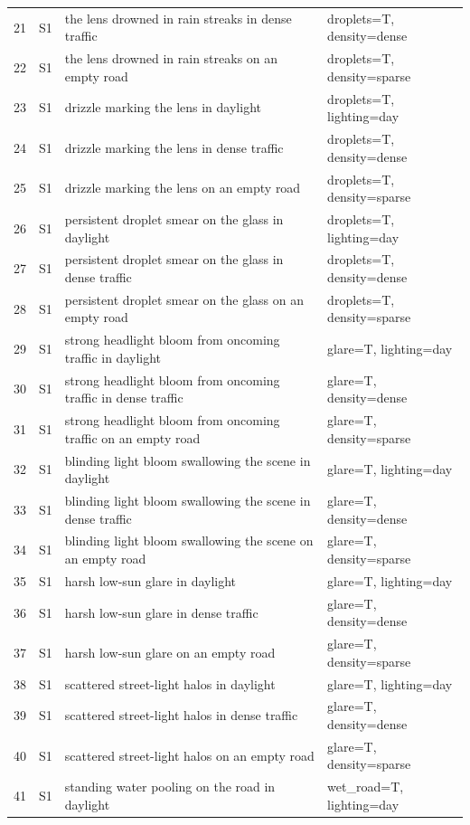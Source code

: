 \begin{longtable}{r l p{8.6cm} p{5.6cm}}
21 & S1 & the lens drowned in rain streaks in dense traffic & droplets=T, density=dense\\
22 & S1 & the lens drowned in rain streaks on an empty road & droplets=T, density=sparse\\
23 & S1 & drizzle marking the lens in daylight & droplets=T, lighting=day\\
24 & S1 & drizzle marking the lens in dense traffic & droplets=T, density=dense\\
25 & S1 & drizzle marking the lens on an empty road & droplets=T, density=sparse\\
26 & S1 & persistent droplet smear on the glass in daylight & droplets=T, lighting=day\\
27 & S1 & persistent droplet smear on the glass in dense traffic & droplets=T, density=dense\\
28 & S1 & persistent droplet smear on the glass on an empty road & droplets=T, density=sparse\\
29 & S1 & strong headlight bloom from oncoming traffic in daylight & glare=T, lighting=day\\
30 & S1 & strong headlight bloom from oncoming traffic in dense traffic & glare=T, density=dense\\
31 & S1 & strong headlight bloom from oncoming traffic on an empty road & glare=T, density=sparse\\
32 & S1 & blinding light bloom swallowing the scene in daylight & glare=T, lighting=day\\
33 & S1 & blinding light bloom swallowing the scene in dense traffic & glare=T, density=dense\\
34 & S1 & blinding light bloom swallowing the scene on an empty road & glare=T, density=sparse\\
35 & S1 & harsh low-sun glare in daylight & glare=T, lighting=day\\
36 & S1 & harsh low-sun glare in dense traffic & glare=T, density=dense\\
37 & S1 & harsh low-sun glare on an empty road & glare=T, density=sparse\\
38 & S1 & scattered street-light halos in daylight & glare=T, lighting=day\\
39 & S1 & scattered street-light halos in dense traffic & glare=T, density=dense\\
40 & S1 & scattered street-light halos on an empty road & glare=T, density=sparse\\
41 & S1 & standing water pooling on the road in daylight & wet\_road=T, lighting=day\\

\end{longtable}
